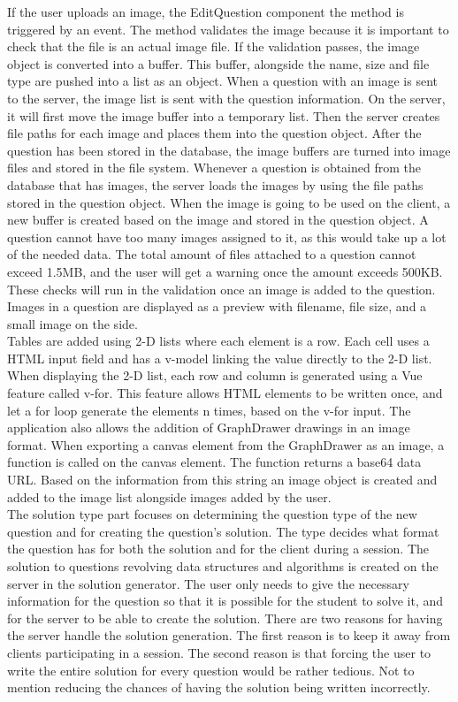 If the user uploads an image, the EditQuestion component the method  is triggered by an  event. The method validates the image because it is important to check that the file is an actual image file. If the validation passes, the image  object is converted into a buffer. This buffer, alongside the name, size and file type are pushed into a list as an object. When a question with an image is sent to the server, the image list is sent with the question information. On the server, it will first move the image buffer into a temporary list. Then the server creates file paths for each image and places them into the question object. After the question has been stored in the database, the image buffers are turned into image files and stored in the file system. Whenever a question is obtained from the database that has images, the server loads the images by using the file paths stored in the question object. When the image is going to be used on the client, a new buffer is created based on the image and stored in the question object. A question cannot have too many images assigned to it, as this would take up a lot of the needed data. The total amount of files attached to a question cannot exceed 1.5MB, and the user will get a warning once the amount exceeds 500KB. These checks will run in the validation once an image is added to the question. Images in a question are displayed as a preview with filename, file size, and a small image on the side.
\\[11pt]
Tables are added using 2-D lists where each element is a row. Each cell uses a HTML input field and has a v-model linking the value directly to the 2-D list. When displaying the 2-D list, each row and column is generated using a Vue feature called v-for. This feature allows HTML elements to be written once, and let a for loop generate the elements n times, based on the v-for input. The application also allows the addition of GraphDrawer drawings in an image format. When exporting a canvas element from the GraphDrawer as an image, a function  is called on the canvas element. The function returns a base64 data URL. Based on the information from this string an image object is created and added to the image list alongside images added by the user.
\\[11pt]
The solution type part focuses on determining the question type of the new question and for creating the question's solution. The type decides what format the question has for both the solution and for the client during a session. The solution to questions revolving data structures and algorithms is created on the server in the solution generator. The user only needs to give the necessary information for the question so that it is possible for the student to solve it, and for the server to be able to create the solution. There are two reasons for having the server handle the solution generation. The first reason is to keep it away from clients participating in a session. The second reason is that forcing the user to write the entire solution for every question would be rather tedious. Not to mention reducing the chances of having the solution being written incorrectly.
